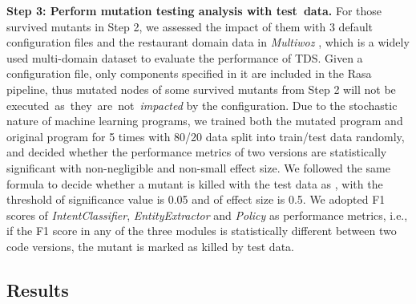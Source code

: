\textbf{Step 3: Perform mutation testing analysis with test~data.} For those survived mutants in Step 2, we assessed the impact of them with 3 default configuration files and the restaurant domain data in \textit{Multiwoz} \cite{multiwoz}, which is a widely used multi-domain dataset to evaluate the performance of TDS.
Given a configuration file, only components specified in it are included in the Rasa pipeline, thus mutated nodes of some survived mutants from Step 2 will not be executed~as~they~are~not~\textit{impacted} by the configuration.
Due to the stochastic nature of machine learning programs, we trained both the mutated program and original program for 5 times with 80/20 data split into train/test data randomly, and decided whether the performance metrics of two versions are statistically significant with non-negligible and non-small effect size.
We followed the same formula to decide whether a mutant is killed with the test data as \cite{mutation_evaluation, DeepCrime}, with the threshold of significance value is 0.05 and of effect size is 0.5.
We adopted F1 scores of \textit{IntentClassifier}, \textit{EntityExtractor} and \textit{Policy} as performance metrics, i.e., if the F1 score in any of the three modules is statistically different between two code versions, the mutant is marked as killed by test data.
\subsection{Results}




